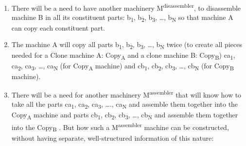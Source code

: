 \begin{enumerate}
\item There will be a need to have another machinery
M\textsuperscript{disassembler}, to disassemble machine B in all its
constituent parts: b\textsubscript{1}, b\textsubscript{2},
b\textsubscript{3}, …, b\textsubscript{N }so that machine A can copy
each constituent part.
\item The machine A will copy all parts b\textsubscript{1},
b\textsubscript{2}, b\textsubscript{3}, …, b\textsubscript{N} twice (to
create all pieces needed for a Clone machine A: Copy\textsubscript{A}
and a clone machine B: Copy\textsubscript{B}) ca\textsubscript{1},
ca\textsubscript{2}, ca\textsubscript{3}, …, ca\textsubscript{N }(for
Copy\textsubscript{A }machine) and cb\textsubscript{1},
cb\textsubscript{2}, cb\textsubscript{3}, …, cb\textsubscript{N} (for
Copy\textsubscript{B} machine).
\item There will be a need for another machinery
M\textsuperscript{assembler }that will know how to take all the parts
ca\textsubscript{1}, ca\textsubscript{2}, ca\textsubscript{3}, ….,
ca\textsubscript{N} and assemble them together into the
Copy\textsubscript{A} machine and parts cb\textsubscript{1},
cb\textsubscript{2}, cb\textsubscript{3}, …, cb\textsubscript{N }and
assemble them together into the Copy\textsubscript{B }. But how such a
M\textsuperscript{assembler} machine can be constructed, without having
separate, well-structured information of this nature:
\end{enumerate}
